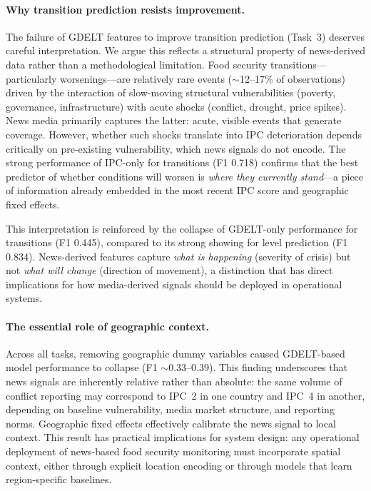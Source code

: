 \documentclass{article}
\begin{document}
\paragraph{Why transition prediction resists improvement.}
The failure of GDELT features to improve transition prediction (Task~3) deserves careful interpretation. We argue this reflects a structural property of news-derived data rather than a methodological limitation. Food security transitions---particularly worsenings---are relatively rare events ($\sim$12--17\% of observations) driven by the interaction of slow-moving structural vulnerabilities (poverty, governance, infrastructure) with acute shocks (conflict, drought, price spikes). News media primarily captures the latter: acute, visible events that generate coverage. However, whether such shocks translate into IPC deterioration depends critically on pre-existing vulnerability, which news signals do not encode. The strong performance of IPC-only for transitions (F1 0.718) confirms that the best predictor of whether conditions will worsen is \textit{where they currently stand}---a piece of information already embedded in the most recent IPC score and geographic fixed effects.

This interpretation is reinforced by the collapse of GDELT-only performance for transitions (F1 0.445), compared to its strong showing for level prediction (F1 0.834). News-derived features capture \textit{what is happening} (severity of crisis) but not \textit{what will change} (direction of movement), a distinction that has direct implications for how media-derived signals should be deployed in operational systems.

\paragraph{The essential role of geographic context.}
Across all tasks, removing geographic dummy variables caused GDELT-based model performance to collapse (F1 $\sim$0.33--0.39). This finding underscores that news signals are inherently relative rather than absolute: the same volume of conflict reporting may correspond to IPC~2 in one country and IPC~4 in another, depending on baseline vulnerability, media market structure, and reporting norms. Geographic fixed effects effectively calibrate the news signal to local context. This result has practical implications for system design: any operational deployment of news-based food security monitoring must incorporate spatial context, either through explicit location encoding or through models that learn region-specific baselines.
\end{document}
